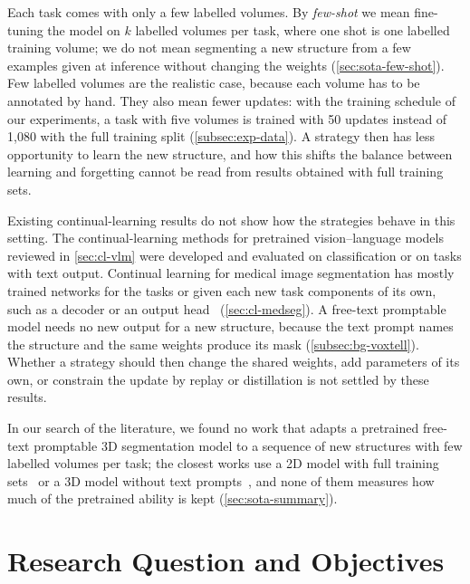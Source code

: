 Each task comes with only a few labelled volumes.
By \emph{few-shot} we mean fine-tuning the model on $k$ labelled volumes per task, where one shot is one labelled training volume; we do not mean segmenting a new structure from a few examples given at inference without changing the weights (\cref{sec:sota-few-shot}).
Few labelled volumes are the realistic case, because each volume has to be annotated by hand.
They also mean fewer updates: with the training schedule of our experiments, a task with five volumes is trained with 50 updates instead of 1{,}080 with the full training split (\cref{subsec:exp-data}).
A strategy then has less opportunity to learn the new structure, and how this shifts the balance between learning and forgetting cannot be read from results obtained with full training sets.

Existing continual-learning results do not show how the strategies behave in this setting.
The continual-learning methods for pretrained vision--language models reviewed in \cref{sec:cl-vlm} were developed and evaluated on classification or on tasks with text output.
Continual learning for medical image segmentation has mostly trained networks for the tasks or given each new task components of its own, such as a decoder or an output head~\cite{ji2023continualsegmentsingleunified,guo2025continuallearningdrivenmodelaccurate,zhang2023continuallearningabdominalmultiorgan,ye2025medseqft} (\cref{sec:cl-medseg}).
A free-text promptable model needs no new output for a new structure, because the text prompt names the structure and the same weights produce its mask (\cref{subsec:bg-voxtell}).
Whether a strategy should then change the shared weights, add parameters of its own, or constrain the update by replay or distillation is not settled by these results.

In our search of the literature, we found no work that adapts a pretrained free-text promptable 3D segmentation model to a sequence of new structures with few labelled volumes per task; the closest works use a 2D model with full training sets~\cite{gao2026medcrpcl,gao2025paewc,gao2026medpeftcl} or a 3D model without text prompts~\cite{chen2026fewshotcontinuallearning3d}, and none of them measures how much of the pretrained ability is kept (\cref{sec:sota-summary}).

\section{Research Question and Objectives}
\label{sec:intro-rq}

